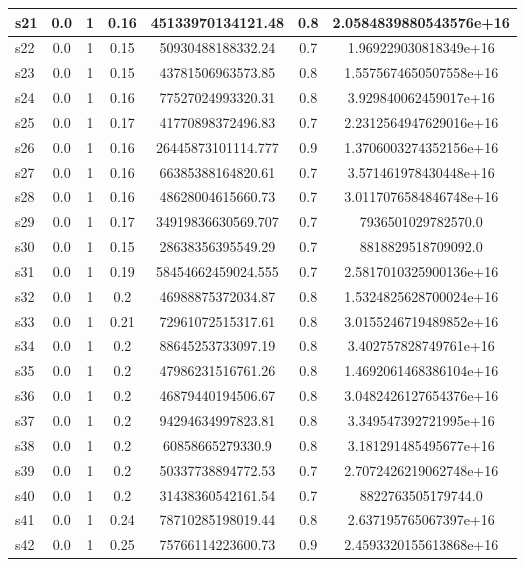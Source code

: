 \documentclass{article}
\begin{document}
\begin{tabular}{|l|c|c|c|c|c|c|}
\hline
s21 &0.0 & 1 & 0.16 & 45133970134121.48 & 0.8 & 2.0584839880543576e+16\\
\hline
s22 &0.0 & 1 & 0.15 & 50930488188332.24 & 0.7 & 1.969229030818349e+16\\
\hline
s23 &0.0 & 1 & 0.15 & 43781506963573.85 & 0.8 & 1.5575674650507558e+16\\
\hline
s24 &0.0 & 1 & 0.16 & 77527024993320.31 & 0.8 & 3.929840062459017e+16\\
\hline
s25 &0.0 & 1 & 0.17 & 41770898372496.83 & 0.7 & 2.2312564947629016e+16\\
\hline
s26 &0.0 & 1 & 0.16 & 26445873101114.777 & 0.9 & 1.3706003274352156e+16\\
\hline
s27 &0.0 & 1 & 0.16 & 66385388164820.61 & 0.7 & 3.571461978430448e+16\\
\hline
s28 &0.0 & 1 & 0.16 & 48628004615660.73 & 0.7 & 3.0117076584846748e+16\\
\hline
s29 &0.0 & 1 & 0.17 & 34919836630569.707 & 0.7 & 7936501029782570.0\\
\hline
s30 &0.0 & 1 & 0.15 & 28638356395549.29 & 0.7 & 8818829518709092.0\\
\hline
s31 &0.0 & 1 & 0.19 & 58454662459024.555 & 0.7 & 2.5817010325900136e+16\\
\hline
s32 &0.0 & 1 & 0.2 & 46988875372034.87 & 0.8 & 1.5324825628700024e+16\\
\hline
s33 &0.0 & 1 & 0.21 & 72961072515317.61 & 0.8 & 3.0155246719489852e+16\\
\hline
s34 &0.0 & 1 & 0.2 & 88645253733097.19 & 0.8 & 3.402757828749761e+16\\
\hline
s35 &0.0 & 1 & 0.2 & 47986231516761.26 & 0.8 & 1.4692061468386104e+16\\
\hline
s36 &0.0 & 1 & 0.2 & 46879440194506.67 & 0.8 & 3.0482426127654376e+16\\
\hline
s37 &0.0 & 1 & 0.2 & 94294634997823.81 & 0.8 & 3.349547392721995e+16\\
\hline
s38 &0.0 & 1 & 0.2 & 60858665279330.9 & 0.8 & 3.181291485495677e+16\\
\hline
s39 &0.0 & 1 & 0.2 & 50337738894772.53 & 0.7 & 2.7072426219062748e+16\\
\hline
s40 &0.0 & 1 & 0.2 & 31438360542161.54 & 0.7 & 8822763505179744.0\\
\hline
s41 &0.0 & 1 & 0.24 & 78710285198019.44 & 0.8 & 2.637195765067397e+16\\
\hline
s42 &0.0 & 1 & 0.25 & 75766114223600.73 & 0.9 & 2.4593320155613868e+16\\

\end{tabular}
\end{document}
